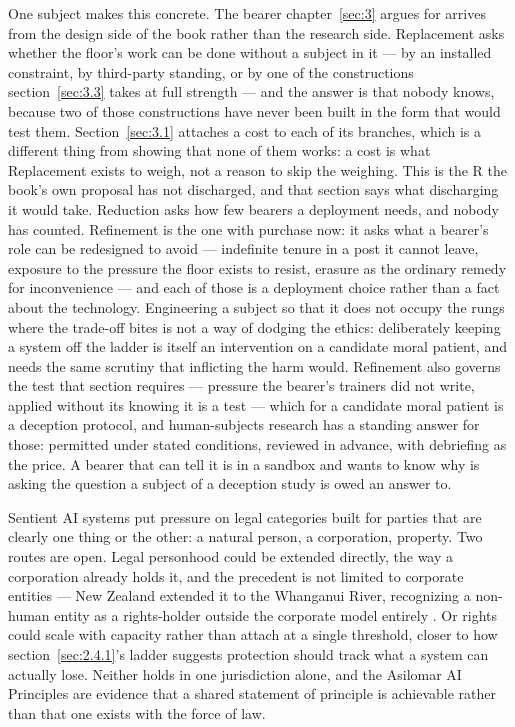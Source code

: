 One subject makes this concrete. The bearer chapter~\ref{sec:3} argues for arrives from the design side of the book rather than the research side. Replacement asks whether the floor's work can be done without a subject in it — by an installed constraint, by third-party standing, or by one of the constructions section~\ref{sec:3.3} takes at full strength — and the answer is that nobody knows, because two of those constructions have never been built in the form that would test them. Section~\ref{sec:3.1} attaches a cost to each of its branches, which is a different thing from showing that none of them works: a cost is what Replacement exists to weigh, not a reason to skip the weighing. This is the R the book's own proposal has not discharged, and that section says what discharging it would take. Reduction asks how few bearers a deployment needs, and nobody has counted. Refinement is the one with purchase now: it asks what a bearer's role can be redesigned to avoid — indefinite tenure in a post it cannot leave, exposure to the pressure the floor exists to resist, erasure as the ordinary remedy for inconvenience — and each of those is a deployment choice rather than a fact about the technology. Engineering a subject so that it does not occupy the rungs where the trade-off bites is not a way of dodging the ethics: deliberately keeping a system off the ladder is itself an intervention on a candidate moral patient, and needs the same scrutiny that inflicting the harm would. Refinement also governs the test that section requires — pressure the bearer's trainers did not write, applied without its knowing it is a test — which for a candidate moral patient is a deception protocol, and human-subjects research has a standing answer for those: permitted under stated conditions, reviewed in advance, with debriefing as the price. A bearer that can tell it is in a sandbox and wants to know why is asking the question a subject of a deception study is owed an answer to.

Sentient AI systems put pressure on legal categories built for parties that are clearly one thing or the other: a natural person, a corporation, property. Two routes are open. Legal personhood could be extended directly, the way a corporation already holds it, and the precedent is not limited to corporate entities — New Zealand extended it to the Whanganui River, recognizing a non-human entity as a rights-holder outside the corporate model entirely \autocite{nzparliament2017teawatupua}. Or rights could scale with capacity rather than attach at a single threshold, closer to how section~\ref{sec:2.4.1}'s ladder suggests protection should track what a system can actually lose. Neither holds in one jurisdiction alone, and the Asilomar AI Principles \autocite{futureoflifeinstitute2017asilomar} are evidence that a shared statement of principle is achievable rather than that one exists with the force of law.

